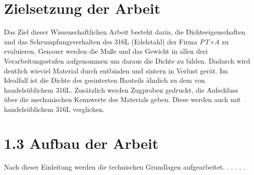\section{Zielsetzung der Arbeit}

Das Ziel dieser Wissenschaftlichen Arbeit besteht darin, die Dichteeigenschaften und das Schrumpfungsverhalten des 316L (Edelstahl) der Firma \textit{PT+A} zu evaluieren. 
Genauer werden die Maße und das Gewicht in allen drei Verarbeitungsstufen aufgenommen um daraus die Dichte zu bilden. Dadurch wird deutlich wieviel Material durch entbinden und sintern in Verlust gerät.
Im Idealfall ist die Dichte des gesinterten Bauteils ähnlich zu dem von handelsüblichem 316L.
Zusätzlich werden Zugproben gedruckt, die Aufschluss über die mechanischen Kennwerte des Materials geben. Diese werden auch mit handelsüblichem 316L verglichen.
    
\section{1.3 Aufbau der Arbeit}

Nach dieser Einleitung werden die technischen Grundlagen aufgearbeitet. 
.
.
.
.
.
